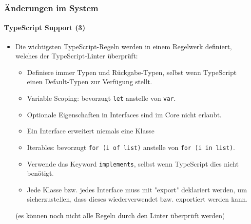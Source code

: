 \begin{frame}[fragile]
	\frametitle{Änderungen im System}
	\framesubtitle{TypeScript Support (3)}

	\begin{itemize}
		\item Die wichtigsten TypeScript-Regeln werden in einem Regelwerk definiert, welches der TypeScript-Linter überprüft:

			\begin{itemize}
				\item Definiere immer Typen und Rückgabe-Typen, selbst wenn TypeScript einen Default-Typen zur Verfügung stellt.
				\item Variable Scoping: bevorzugt \texttt{let} anstelle von \texttt{var}.
				\item Optionale Eigenschaften in Interfaces sind im Core nicht erlaubt.
				\item Ein Interface erweitert niemals eine Klasse
				\item Iterables: bevorzugt \texttt{for (i of list)} anstelle von \texttt{for (i in list)}.
				\item Verwende das Keyword \texttt{implements}, selbst wenn TypeScript dies nicht benötigt.
				\item Jede Klasse bzw. jedes Interface muss mit "export" deklariert werden, um sicherzustellen, dass dieses wiederverwendet bzw. exportiert werden kann.
			\end{itemize}

			\small(es können noch nicht alle Regeln durch den Linter überprüft werden)\normalsize

	\end{itemize}

\end{frame}


